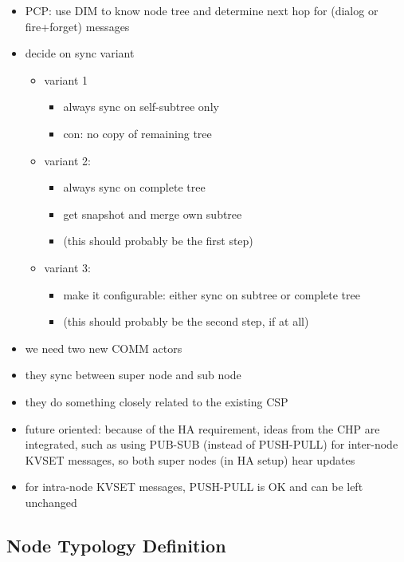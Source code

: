 \begin{itemize}
	\item PCP: use DIM to know node tree and determine next hop for (dialog or fire+forget) messages
	\item decide on sync variant
	\begin{itemize}
		\item variant 1
		\begin{itemize}
			\item always sync on self-subtree only
			\item con: no copy of remaining tree
		\end{itemize}

		\item variant 2:
		\begin{itemize}
			\item always sync on complete tree
			\item get snapshot and merge own subtree
			\item (this should probably be the first step)
		\end{itemize}

		\item variant 3:
		\begin{itemize}
			\item make it configurable: either sync on subtree or complete tree
			\item (this should probably be the second step, if at all)
		\end{itemize}
	\end{itemize}
\end{itemize}


\begin{itemize}
	\item we need two new COMM actors
	\item they sync between super node and sub node
	\item they do something closely related to the existing CSP
	\item future oriented: because of the HA requirement, ideas from the CHP are integrated, such as using PUB-SUB (instead of PUSH-PULL) for inter-node KVSET messages, so both super nodes (in HA setup) hear updates
	\item for intra-node KVSET messages, PUSH-PULL is OK and can be left unchanged
\end{itemize}

\subsection{Node Typology Definition}

